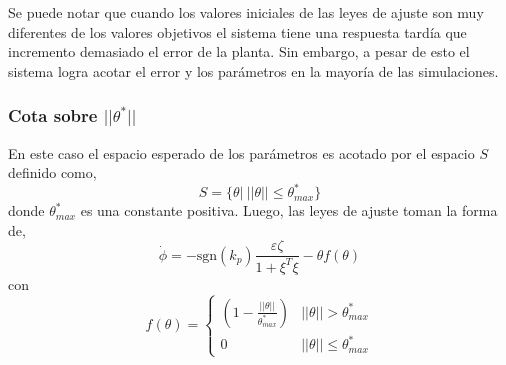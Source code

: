 \documentclass[letterpaper,11pt]{article} %
\begin{document}
Se puede notar que cuando los valores iniciales de las leyes de ajuste son muy diferentes de los valores objetivos el sistema tiene una respuesta tardía que incremento demasiado el error de la planta. Sin embargo, a pesar de esto el sistema logra acotar el error y los parámetros en la mayoría de las simulaciones.
\newpage
\subsubsection{Cota sobre $||\theta^*||$}
En este caso el espacio esperado de los parámetros es acotado por el espacio $S$ definido como,
\begin{equation}
	S = \{\theta|\  ||\theta|| \le \theta_{max}^*\}
\end{equation}
donde $\theta_{max}^*$ es una constante positiva. Luego, las leyes de ajuste toman la forma de,
\begin{equation}
	\dot{\phi} = -\mathrm{sgn}(k_p) \frac{\varepsilon \zeta}{1 + \xi^T \xi} - \theta f(\theta)
\end{equation}
con 
\begin{equation}
	f(\theta) = \left\{ \begin{array}{cc}
	\left( 1 - \frac{||\theta||}{\theta_{max}^*}\right) & ||\theta|| > \theta_{max}^*\\
	0 & ||\theta|| \le \theta_{max}^*
	\end{array}\right.
\end{equation}
\end{document}
